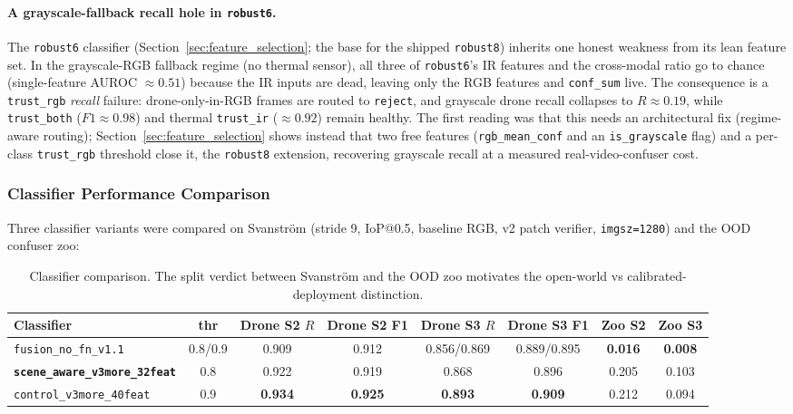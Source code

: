 \paragraph{A grayscale-fallback recall hole in \texttt{robust6}.}
The \texttt{robust6} classifier (Section~\ref{sec:feature_selection}; the base for the shipped \texttt{robust8}) inherits one honest weakness from its lean feature set. In the grayscale-RGB fallback regime (no thermal sensor), all three of \texttt{robust6}'s IR features and the cross-modal ratio go to chance (single-feature AUROC $\approx 0.51$) because the IR inputs are dead, leaving only the RGB features and \texttt{conf\_sum} live. The consequence is a \texttt{trust\_rgb} \emph{recall} failure: drone-only-in-RGB frames are routed to \texttt{reject}, and grayscale drone recall collapses to $R\approx0.19$, while \texttt{trust\_both} ($F1\approx0.98$) and thermal \texttt{trust\_ir} ($\approx0.92$) remain healthy. The first reading was that this needs an architectural fix (regime-aware routing); Section~\ref{sec:feature_selection} shows instead that two free features (\texttt{rgb\_mean\_conf} and an \texttt{is\_grayscale} flag) and a per-class \texttt{trust\_rgb} threshold close it, the \texttt{robust8} extension, recovering grayscale recall at a measured real-video-confuser cost.

\subsubsection{Classifier Performance Comparison}
\label{sec:classifier_compare}

Three classifier variants were compared on Svanstr\"om (stride 9, IoP@0.5, baseline RGB, v2 patch verifier, \texttt{imgsz=1280}) and the OOD confuser zoo:

\begin{table}[htbp]
    \centering
    \caption{Classifier comparison. The split verdict between Svanstr\"om and the OOD zoo motivates the open-world vs calibrated-deployment distinction.}
    \label{tab:classifiers}
    \begin{tabular}{lccccccc}
        \toprule
        Classifier & thr & Drone S2 $R$ & Drone S2 F1 & Drone S3 $R$ & Drone S3 F1 & Zoo S2 & Zoo S3 \\
        \midrule
        \texttt{fusion\_no\_fn\_v1.1}        & 0.8/0.9 & 0.909 & 0.912 & 0.856/0.869 & 0.889/0.895 & \textbf{0.016} & \textbf{0.008} \\
        \textbf{\texttt{scene\_aware\_v3more\_32feat}} & 0.8 & 0.922 & 0.919 & 0.868 & 0.896 & 0.205 & 0.103 \\
        \texttt{control\_v3more\_40feat} & 0.9 & \textbf{0.934} & \textbf{0.925} & \textbf{0.893} & \textbf{0.909} & 0.212 & 0.094 \\
        \bottomrule
    \end{tabular}
\end{table}

